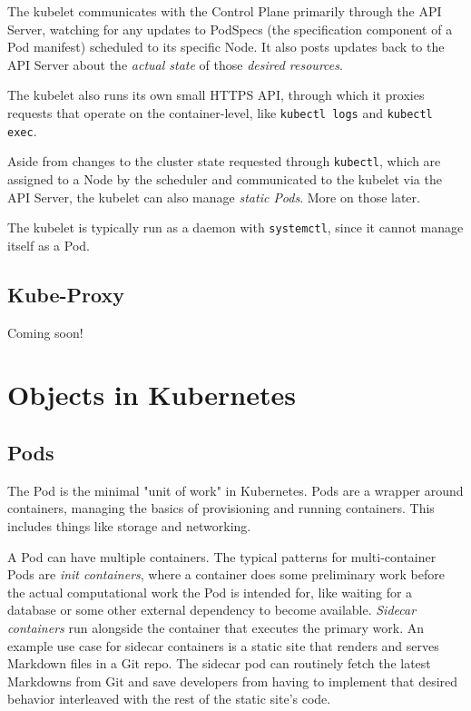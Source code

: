 \documentclass[11pt, a4paper]{article}
\begin{document}
The kubelet communicates with the Control Plane primarily through the API Server, watching for any updates to PodSpecs (the specification component of a Pod manifest) scheduled to its specific Node. It also posts updates back to the API Server about the \textit{actual state} of those \textit{desired resources}.

The kubelet also runs its own small HTTPS API, through which it proxies requests that operate on the container-level, like \texttt{kubectl logs} and \texttt{kubectl exec}.

Aside from changes to the cluster state requested through \texttt{kubectl}, which are assigned to a Node by the scheduler and communicated to the kubelet via the API Server, the kubelet can also manage \textit{static Pods}. More on those later.

The kubelet is typically run as a daemon with \texttt{systemctl}, since it cannot manage itself as a Pod.

\subsection{Kube-Proxy}

Coming soon!

\section{Objects in Kubernetes}

\subsection{Pods}

The Pod is the minimal "unit of work" in Kubernetes. Pods are a wrapper around containers, managing the basics of provisioning and running containers. This includes things like storage and networking.

A Pod can have multiple containers. The typical patterns for multi-container Pods are \textit{init containers}, where a container does some preliminary work before the actual computational work the Pod is intended for, like waiting for a database or some other external dependency to become available. \textit{Sidecar containers} run alongside the container that executes the primary work. An example use case for sidecar containers is a static site that renders and serves Markdown files in a Git repo. The sidecar pod can routinely fetch the latest Markdowns from Git and save developers from having to implement that desired behavior interleaved with the rest of the static site's code. 
\end{document}
